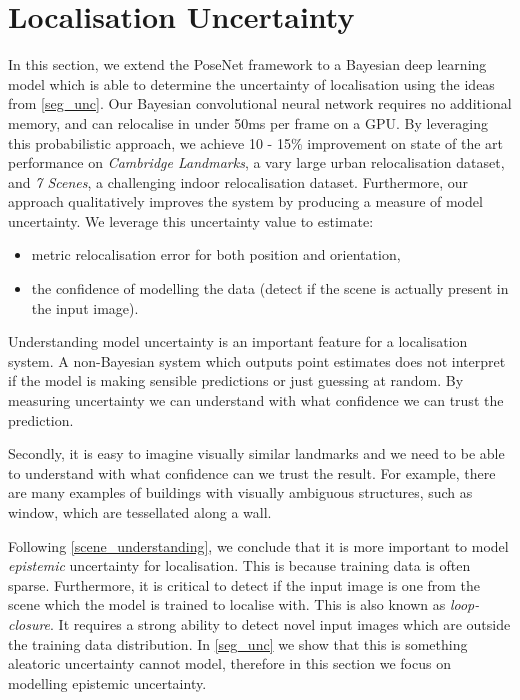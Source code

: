 \section{Localisation Uncertainty}
\label{loc_unc}

In this section, we extend the PoseNet framework to a Bayesian deep learning model which is able to determine the uncertainty of localisation using the ideas from \cref{seg_unc}. Our Bayesian convolutional neural network requires no additional memory, and can relocalise in under 50ms per frame on a GPU. By leveraging this probabilistic approach, we achieve 10 - 15\% improvement on state of the art performance on \textit{Cambridge Landmarks}, a vary large urban relocalisation dataset, and \textit{7 Scenes}, a challenging indoor relocalisation dataset. Furthermore, our approach qualitatively improves the system by producing a measure of model uncertainty. We leverage this uncertainty value to estimate:
\begin{itemize}
\item metric relocalisation error for both position and orientation,
\item the confidence of modelling the data (detect if the scene is actually present in the input image).
\end{itemize}

Understanding model uncertainty is an important feature for a localisation system. A non-Bayesian system which outputs point estimates does not interpret if the model is making sensible predictions or just guessing at random. By measuring uncertainty we can understand with what confidence we can trust the prediction.

Secondly, it is easy to imagine visually similar landmarks and we need to be able to understand with what confidence can we trust the result. For example, there are many examples of buildings with visually ambiguous structures, such as window, which are tessellated along a wall.

Following \cref{scene_understanding}, we conclude that it is more important to model \textit{epistemic} uncertainty for localisation. This is because training data is often sparse. Furthermore, it is critical to detect if the input image is one from the scene which the model is trained to localise with. This is also known as \textit{loop-closure}. It requires a strong ability to detect novel input images which are outside the training data distribution. In \cref{seg_unc} we show that this is something aleatoric uncertainty cannot model, therefore in this section we focus on modelling epistemic uncertainty.

